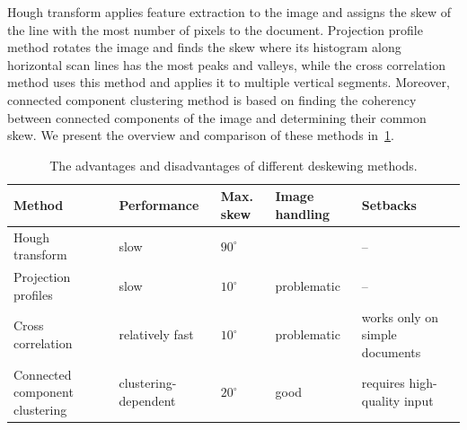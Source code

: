  Hough transform applies feature extraction to the image and assigns the skew of the line with the most number of pixels to the document. Projection profile method rotates the image and finds the skew where its histogram along horizontal scan lines has the most peaks and valleys, while the cross correlation method uses this method and applies it to multiple vertical segments. Moreover, connected component clustering method is based on finding the coherency between connected components of the image and determining their common skew. We present the overview and comparison of these methods in~\cref{tab:preprocessSkewProsCons}.

\begin{table}[t]
\renewcommand{\arraystretch}{1.5}
{\footnotesize
\begin{tabular}{p{8em}p{7em}p{2.5em}p{6em}p{9em}}
\toprule
\textbf{Method} & \textbf{Performance} & \textbf{Max. skew} & \textbf{Image handling} & \textbf{Setbacks} \\
\midrule
Hough transform
&
slow
&
$90^{\circ}$
&

&
--
\\
Projection profiles
&
slow
&
$10^{\circ}$
&
problematic
&
--
\\
Cross correlation
&
relatively fast
&
$10^{\circ}$
&
problematic
&
works only on simple documents
\\
Connected component clustering
&
clustering-dependent
&
$20^{\circ}$
&
good
&
requires high-quality input
\\
\bottomrule
\end{tabular}
}
\caption{The advantages and disadvantages of different deskewing methods.}
\label{tab:preprocessSkewProsCons}
\end{table}

